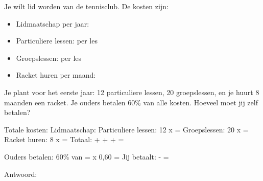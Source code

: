 \begin{opgave}
Je wilt lid worden van de tennisclub. De kosten zijn:

\begin{itemize}
\item Lidmaatschap per jaar: 
\item Particuliere lessen:  per les
\item Groepslessen:  per les
\item Racket huren per maand: 
\end{itemize}

Je plant voor het eerste jaar: 12 particuliere lessen, 20 groepslessen,
en je huurt 8 maanden een racket. Je ouders betalen 60\% van alle kosten.
Hoeveel moet jij zelf betalen?
\end{opgave}

\begin{oplossing}
Totale kosten:
Lidmaatschap: 
Particuliere lessen: 12 x  = 
Groepslessen: 20 x  = 
Racket huren: 8 x  = 
Totaal:  +  +  +  = 

Ouders betalen: 60\% van  =  x 0,60 = 
Jij betaalt:  -  = 

Antwoord: 
\end{oplossing}